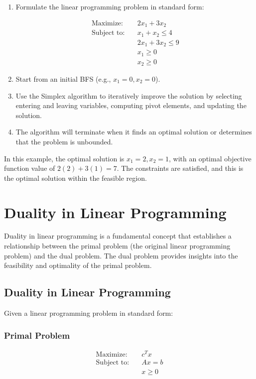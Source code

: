 \documentclass[a4paper]{article}
\begin{document}
\begin{enumerate}
    \item Formulate the linear programming problem in standard form:
    
    \begin{align*}
    \text{Maximize:} \quad & 2x_1 + 3x_2 \\
    \text{Subject to:} \quad & x_1 + x_2 \leq 4 \\
    & 2x_1 + 3x_2 \leq 9 \\
    & x_1 \geq 0 \\
    & x_2 \geq 0
    \end{align*}
    
    \item Start from an initial BFS (e.g., $x_1 = 0, x_2 = 0$).
    
    \item Use the Simplex algorithm to iteratively improve the solution by selecting entering and leaving variables, computing pivot elements, and updating the solution.
    
    \item The algorithm will terminate when it finds an optimal solution or determines that the problem is unbounded.
\end{enumerate}

In this example, the optimal solution is $x_1 = 2, x_2 = 1$, with an optimal objective function value of $2(2) + 3(1) = 7$. The constraints are satisfied, and this is the optimal solution within the feasible region.

\section{Duality in Linear Programming}

Duality in linear programming is a fundamental concept that establishes a relationship between the primal problem (the original linear programming problem) and the dual problem. The dual problem provides insights into the feasibility and optimality of the primal problem.

\subsection{Duality in Linear Programming}

Given a linear programming problem in standard form:

\subsubsection{Primal Problem}
\begin{align*}
\text{Maximize:} \quad & c^Tx \\
\text{Subject to:} \quad & Ax = b \\
& x \geq 0
\end{align*}
\end{document}
